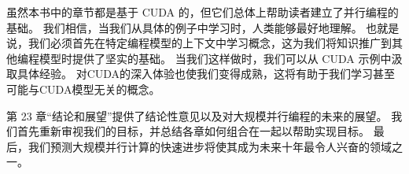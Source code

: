 虽然本书中的章节都是基于 CUDA 的，但它们总体上帮助读者建立了并行编程的基础。 我们相信，当我们从具体的例子中学习时，人类能够最好地理解。 也就是说，我们必须首先在特定编程模型的上下文中学习概念，这为我们将知识推广到其他编程模型时提供了坚实的基础。 当我们这样做时，我们可以从 CUDA 示例中汲取具体经验。 对CUDA的深入体验也使我们变得成熟，这将有助于我们学习甚至可能与CUDA模型无关的概念。

第 23 章“结论和展望”提供了结论性意见以及对大规模并行编程的未来的展望。 我们首先重新审视我们的目标，并总结各章如何组合在一起以帮助实现目标。 最后，我们预测大规模并行计算的快速进步将使其成为未来十年最令人兴奋的领域之一。
